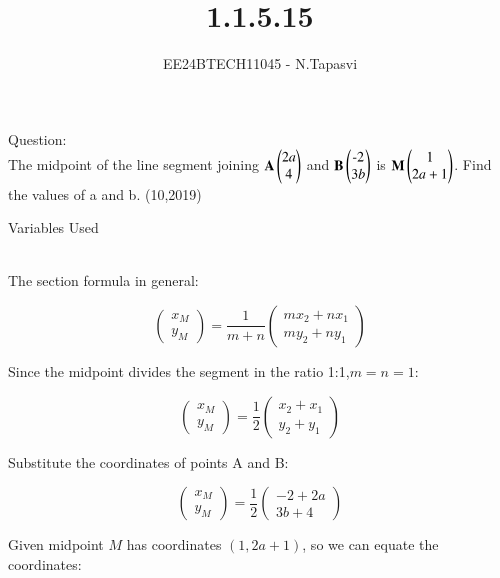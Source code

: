 \documentclass[journal]{IEEEtran}
\begin{document}

\vspace{3cm}

\title{1.1.5.15}
\author{EE24BTECH11045 - N.Tapasvi}
{\let\newpage\relax\maketitle}
Question:\\
The midpoint of the line segment joining $\mathbf{A}\begin{pmatrix}2a\\4\end{pmatrix}$ and $\mathbf{B}\begin{pmatrix}\text{-}2\\3b\end{pmatrix}$ is $\mathbf{M}\begin{pmatrix}1\\2a+1\end{pmatrix}$. Find the values of a and b.
\hfill (10,2019)

\solution
\begin{table}[h!]    
  \centering
  
  \caption{Variables Used}
  \label{tab1-1.5-15}
\end{table}\\


The section formula in general:

\[
\begin{pmatrix}
x_M \\
y_M
\end{pmatrix}
=
\frac{1}{m + n}
\begin{pmatrix}
m x_2 + n x_1 \\
m y_2 + n y_1
\end{pmatrix}
\]

Since the midpoint divides the segment in the ratio 1:1,\( m = n = 1 \):

\[
\begin{pmatrix}
x_M \\
y_M
\end{pmatrix}
=
\frac{1}{2}
\begin{pmatrix}
x_2 + x_1 \\
y_2 + y_1
\end{pmatrix}
\]

Substitute the coordinates of points A and B:

\[
\begin{pmatrix}
x_M \\
y_M
\end{pmatrix}
=
\frac{1}{2}
\begin{pmatrix}
-2 + 2a \\
3b + 4
\end{pmatrix}
\]

Given midpoint \( M \) has coordinates \( (1, 2a + 1) \), so we can equate the coordinates:
\end{document}
